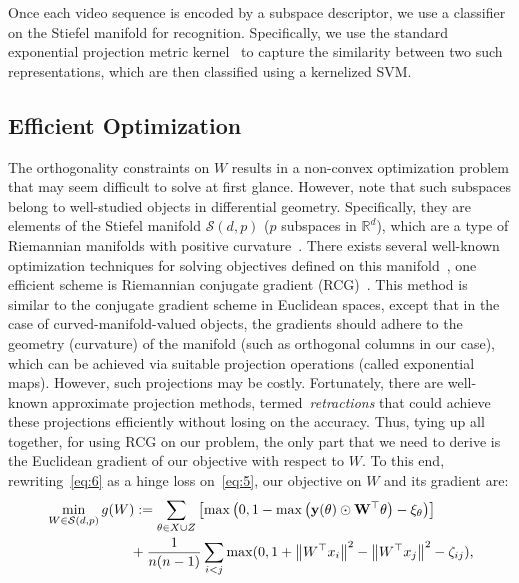 \documentclass[runningheads]{llncs}
\newcommand{\reals}[1]{\mathbb{R}^{#1}}
\newcommand{\enorm}[1]{\left\|{#1}\right\|}
\newcommand{\stiefel}{\mathcal{S}}
\begin{document}
Once each video sequence is encoded by a subspace descriptor, we use a classifier on the Stiefel manifold for recognition. Specifically, we use the standard exponential projection metric kernel~\cite{grp,harandi2014expanding} to capture the similarity between two such representations, which are then classified using a kernelized SVM.

\subsection{Efficient Optimization}
The orthogonality constraints on $W$ results in a non-convex optimization problem that may seem difficult to solve at first glance. However, note that such subspaces belong to well-studied objects in differential geometry. Specifically, they are elements of the Stiefel manifold $\stiefel(d,p)$ ($p$ subspaces in $\reals{d}$), which are a type of Riemannian manifolds with positive curvature~\cite{boothby1986introduction}. There exists several well-known optimization techniques for solving objectives defined on this manifold~\cite{absil2009optimization}, one efficient scheme is Riemannian conjugate gradient (RCG)~\cite{smith1994optimization}. This method is similar to the conjugate gradient scheme in Euclidean spaces, except that in the case of curved-manifold-valued objects, the gradients should adhere to the geometry (curvature) of the manifold (such as orthogonal columns in our case), which can be achieved via suitable projection operations (called exponential maps). However, such projections may be costly. Fortunately, there are well-known approximate projection methods, termed~\emph{retractions} that could achieve these projections efficiently without losing on the accuracy. Thus, tying up all together, for using RCG on our problem, the only part that we need to derive is the Euclidean gradient of our objective with respect to $W$. To this end, rewriting~\eqref{eq:6} as a hinge loss on~\eqref{eq:5}, our objective on $W$ and its gradient are:
\begin{align}
&\min_{W\in\stiefel(d,p)} g(W):= \sum_{\theta \in X\cup Z}\left[\max\left(0, 1-\max\left(\bf{y}(\theta) \odot W^\top \theta\right) - \xi_{\theta}\right)\right] \notag\\ 
&\qquad\qquad\qquad + \frac{1}{n(n-1)}\sum_{i<j}\max(0, 1+\enorm{W^\top x_i}^2-\enorm{W^\top x_j}^2-\zeta_{ij}),
\end{align}
\end{document}
